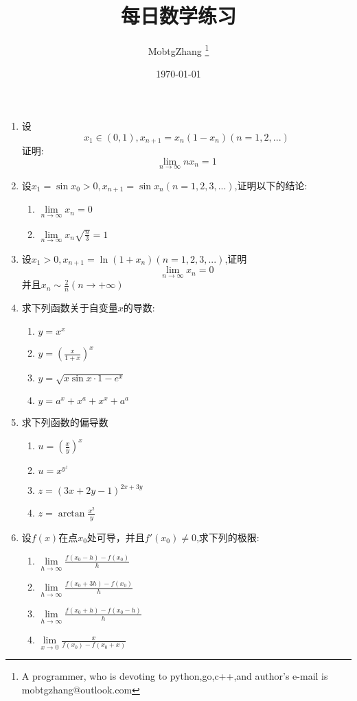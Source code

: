 \documentclass[UTF8,a4paper,10pt]{ctexart}
\title{每日数学练习}
\author{ MobtgZhang \thanks{A programmer, who is devoting to python,go,c++,and author's e-mail is mobtgzhang@outlook.com} }
\date{\today}
\begin{document}
	\maketitle
	\thispagestyle{fancy}
	\begin{flushleft}
		\begin{enumerate}
			\item 设
				\begin{equation}
				x_{1}\in(0,1),x_{n+1}=x_{n}(1-x_{n})(n=1,2,...) \nonumber
				\end{equation}
				证明:
				\begin{equation}
				\lim\limits_{n\rightarrow\infty}nx_{n}=1\nonumber
				\end{equation}
			\item 设$x_{1}=\sin x_{0}>0,x_{n+1}=\sin x_{n}(n=1,2,3,...)$,证明以下的结论:
				\begin{enumerate}
					\item $\lim\limits_{n\rightarrow\infty}x_{n}=0$
					\item $\lim\limits_{n\rightarrow\infty}x_{n}\sqrt{\frac{n}{3}}=1$
				\end{enumerate}
			\item 设$x_{1}>0,x_{n+1}=\ln(1+x_{n})(n=1,2,3,...)$,证明
				\begin{equation}
					\lim\limits_{n\rightarrow\infty}x_{n}=0\nonumber
				\end{equation}
				并且$x_{n}\sim\frac{2}{n}(n\rightarrow+\infty)$
			\item 求下列函数关于自变量$x$的导数:
				\begin{enumerate}
					\item $y=x^{x}$
					\item $y=(\frac{x}{1+x})^{x}$
					\item $y=\sqrt{x\sin{x}\cdot{1-e^{x}}}$
					\item $y=a^{x}+x^{a}+x^{x}+a^{a}$
				\end{enumerate}
			\item 求下列函数的偏导数
			\begin{enumerate}
				\item $u=(\frac{x}{y})^{x}$
				\item $u=x^{y^{z}}$
				\item $z=(3x+2y-1)^{2x+3y}$
				\item $z=\arctan{\frac{x^{2}}{y}}$
			\end{enumerate}
			
			\item 设$f(x)$在点$x_{0}$处可导，并且$f{'}(x_{0})\neq{0}$,求下列的极限:
			\begin{enumerate}
				\item $\lim\limits_{h\rightarrow\infty}\frac{f(x_{0}-h)-f(x_{0})}{h}$
				\item $\lim\limits_{h\rightarrow\infty}\frac{f(x_{0}+3h)-f(x_{0})}{h}$
				\item $\lim\limits_{h\rightarrow\infty}\frac{f(x_{0}+h)-f(x_{0}-h)}{h}$
				\item $\lim\limits_{x\rightarrow{0}}\frac{x}{f(x_{0})-f(x_{0}+x)}$
			\end{enumerate}
		\end{enumerate}
	\end{flushleft}
\end{document}
